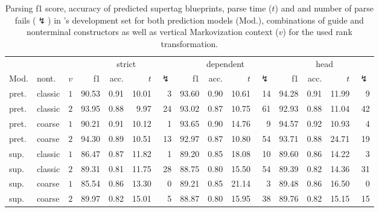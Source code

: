 \documentclass[../../document.tex]{subfiles}
\begin{document}
    \begin{table}
        \caption{\label{tbl:experiments:dptb}
        Parsing f1 score, accuracy of predicted supertag blueprints, parse time ($t$) and and number of parse fails ($\lightning$) in 's development set for both prediction models (Mod.), combinations of guide and nonterminal constructors as well as vertical Markovization context ($v$) for the used rank transformation.
        }
        \centering
        \setlength{\tabcolsep}{4pt}
        \vspace{.2cm}
        \begin{tabular}{llc|rrrr|rrrr|rrrr}
            \toprule
  &             &        & \multicolumn{4}{c|}{strict} & \multicolumn{4}{c|}{dependent} & \multicolumn{4}{c}{head}  \\
Mod. &     nont.   &\(v\)   & f1 & acc. & $t$ & $\lightning$ & f1 & acc. & $t$ & $\lightning$ & f1 & acc. & $t$ & $\lightning$ \\ \hline
pret. &     classic & \(1\)  & 90.53 & 0.91 & 10.01 & 3 & 93.60 & 0.90 & 10.61 & 14 & 94.28 & 0.91 & 11.99 & 9 \\
pret. &     classic & \(2\)  & 93.95 & 0.88 & 9.97 & 24 & 93.02 & 0.87 & 10.75 & 61 & 92.93 & 0.88 & 11.04 & 42 \\
pret. &     coarse  & \(1\)  & 90.21 & 0.91 & 10.12 & 1 & 93.65 & 0.90 & 14.76 & 9 & 94.57 & 0.92 & 10.93 & 4 \\
pret. &     coarse  & \(2\)  & 94.30 & 0.89 & 10.51 & 13 & 92.97 & 0.87 & 10.80 & 54 & 93.71 & 0.88 & 24.71 & 19 \\
\midrule
sup. & classic & \(1\)  & 86.47 & 0.87 & 11.82 & 1 & 89.20 & 0.85 & 18.08 & 10 & 89.60 & 0.86 & 14.22 & 3 \\
sup. & classic & \(2\)  & 89.31 & 0.81 & 11.75 & 28 & 88.75 & 0.80 & 15.50 & 54 & 89.39 & 0.82 & 14.36 & 31 \\
sup. & coarse  & \(1\)  & 85.54 & 0.86 & 13.30 & 0 & 89.21 & 0.85 & 21.14 & 3 & 89.48 & 0.86 & 16.50 & 0 \\
sup. & coarse  & \(2\)  & 89.97 & 0.82 & 15.01 & 5 & 88.87 & 0.80 & 15.95 & 38 & 89.76 & 0.82 & 15.15 & 15 \\
    \bottomrule
        \end{tabular}
    \end{table}
\end{document}
